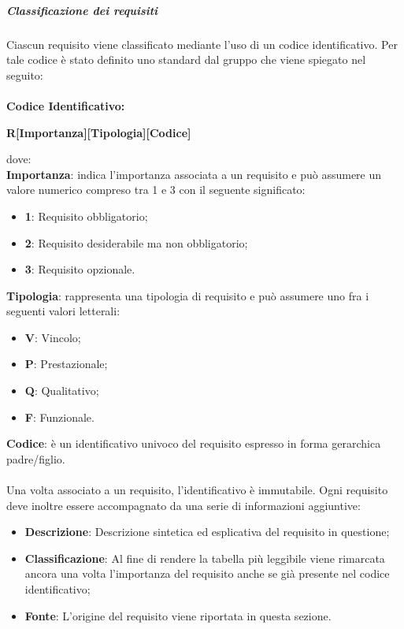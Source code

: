             \subparagraph{Classificazione dei requisiti} \label{subparagraph:Classificazione dei requisiti}
            Ciascun requisito viene classificato mediante l'uso di un codice identificativo. Per tale codice è stato definito uno standard dal gruppo che viene spiegato nel seguito:\\\\
            \textbf{Codice Identificativo:}\\
            \begin{center}
                \textbf{\Large{R[Importanza][Tipologia][Codice]}}
            \end{center}
            dove:\\

            \textbf{Importanza}: indica l'importanza associata a un requisito e può assumere un valore numerico compreso tra 1 e 3 con il seguente significato:
                \begin{itemize}[label={}]
                    \item \textbf{1}: Requisito obbligatorio;
                    \item \textbf{2}: Requisito desiderabile ma non obbligatorio;
                    \item \textbf{3}: Requisito opzionale.
                \end{itemize}

            \textbf{Tipologia}: rappresenta una tipologia di requisito e può assumere uno fra i seguenti valori letterali:
            \begin{itemize}[label={}]
                \item \textbf{V}: Vincolo;
                \item \textbf{P}: Prestazionale;
                \item \textbf{Q}: Qualitativo;
                \item \textbf{F}: Funzionale.
            \end{itemize}

            \textbf{Codice}: è un identificativo univoco del requisito espresso in forma gerarchica padre/figlio.
            \\
            \\
            Una volta associato a un requisito, l'identificativo è immutabile.
            Ogni requisito deve inoltre essere accompagnato da una serie di informazioni aggiuntive:
            \begin{itemize}
                \item \textbf{Descrizione}: Descrizione sintetica ed esplicativa del requisito in questione;
                \item \textbf{Classificazione}: Al fine di rendere la tabella più leggibile viene rimarcata ancora una volta l'importanza del requisito anche se già presente nel codice identificativo;
                \item \textbf{Fonte}: L'origine del requisito viene riportata in questa sezione.
            \end{itemize}
            
